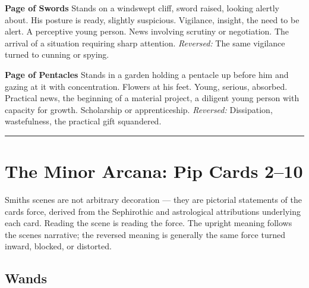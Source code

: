 \textbf{Page of Swords} Stands on a windswept cliff, sword raised, looking alertly about. His posture is ready, slightly suspicious. Vigilance, insight, the need to be alert. A perceptive young person. News involving scrutiny or negotiation. The arrival of a situation requiring sharp attention. \emph{Reversed:} The same vigilance turned to cunning or spying.

\textbf{Page of Pentacles} Stands in a garden holding a pentacle up before him and gazing at it with concentration. Flowers at his feet. Young, serious, absorbed. Practical news, the beginning of a material project, a diligent young person with capacity for growth. Scholarship or apprenticeship. \emph{Reversed:} Dissipation, wastefulness, the practical gift squandered.

\begin{center}\rule{0.5\linewidth}{0.5pt}\end{center}

\section{The Minor Arcana: Pip Cards 2--10}\label{the-minor-arcana-pip-cards-210}

Smith\textquotesingle s scenes are not arbitrary decoration --- they are pictorial statements of the card\textquotesingle s force, derived from the Sephirothic and astrological attributions underlying each card. Reading the scene is reading the force. The upright meaning follows the scene\textquotesingle s narrative; the reversed meaning is generally the same force turned inward, blocked, or distorted.

\subsection{Wands}\label{wands}

